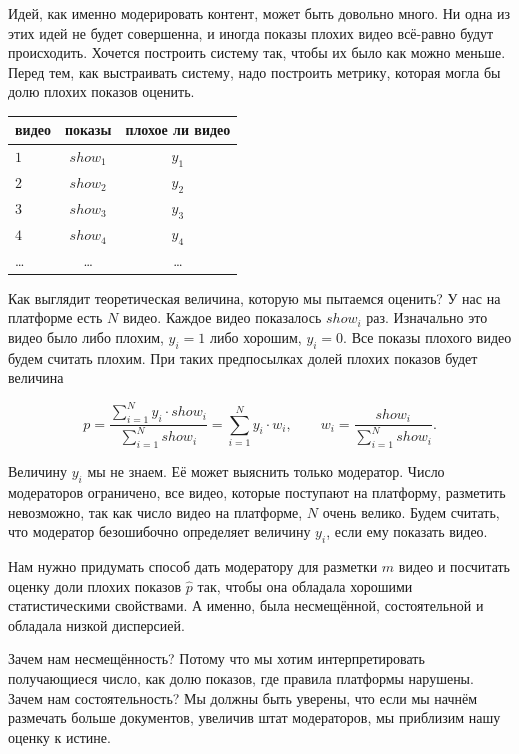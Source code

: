 \documentclass[12pt, a4paper, oneside]{article}
\begin{document}
Идей, как именно модерировать контент, может быть довольно много. Ни одна из этих идей не будет совершенна, и иногда показы плохих видео всё-равно будут происходить. Хочется построить систему так, чтобы их было как можно меньше. Перед тем, как выстраивать систему, надо построить метрику, которая могла бы долю плохих показов оценить. 

\begin{center}
	\begin{tabular}{l|c|c}
		\hline
	   видео  & показы & плохое ли видео  \\  \hline 
		 $1$  & $show_1$ & $y_1$  \\ 
		 $2$  & $show_2$ & $y_2$  \\ 
		 $3$  & $show_3$ & $y_3$  \\ 
		 $4$  & $show_4$ & $y_4$  \\ 
		 \ldots  & \ldots & \ldots  \\ 
	\end{tabular}
\end{center}

Как выглядит теоретическая величина, которую мы пытаемся оценить?   У нас на платформе есть $N$ видео.  Каждое видео показалось $show_i$ раз. Изначально это видео было либо плохим, $y_i = 1$ либо хорошим, $y_i = 0$. Все показы плохого видео будем считать плохим.  При таких предпосылках долей плохих показов будет величина 

\[ 
p = \frac{\sum_{i=1}^N y_i \cdot show_i }{\sum_{i=1}^N show_i} = \sum_{i=1}^N y_i \cdot w_i, \qquad w_i = \frac{show_i}{\sum_{i=1}^N show_i}. 
\]

Величину $y_i$ мы не знаем. Её может выяснить только модератор. Число модераторов ограничено, все видео, которые поступают на платформу, разметить невозможно, так как число видео на платформе, $N$ очень велико. Будем считать, что модератор безошибочно определяет величину $y_i$, если ему показать видео. 

Нам нужно придумать способ дать модератору для разметки $m$ видео и посчитать оценку доли плохих показов $\hat{p}$ так, чтобы она обладала хорошими статистическими свойствами. А именно, была несмещённой, состоятельной и обладала низкой дисперсией. 

Зачем нам несмещённость? Потому что мы хотим интерпретировать получающиеся число, как долю показов, где правила платформы нарушены. Зачем нам состоятельность? Мы должны быть уверены, что если мы начнём размечать больше документов, увеличив штат модераторов, мы приблизим нашу оценку к истине. 
\end{document}

